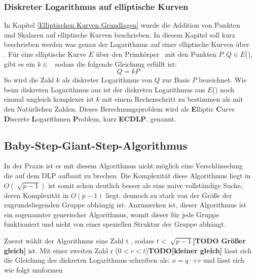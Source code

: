 		
		\subsubsection{Diskreter Logarithmus auf elliptische Kurven}
			In Kapitel \ref{Elliptischen Kurven Grundlagen} wurde die Addition von Punkten und Skalaren auf elliptische Kurven beschrieben. In diesem Kapitel soll kurz beschrieben werden was genau der Logarithmus auf einer elliptische Kurven über \myZPStern. Für eine elliptische Kurve $E$ über den Primkörper \myZPStern~mit den Punkten $P, Q \in E$(\myZPStern), gibt es ein $k \in$ \myZPStern~sodass die folgende Gleichung erfüllt ist:
			\begin{displaymath}
				Q = kP
			\end{displaymath}
			So wird die Zahl $k$ als diskreter Logarithmus von $Q$ zur Basis $P$ bezeichnet. Wie beim diskreten Logarithmus aus \myZPStern ist der diskreten Logarithmus aus $E$(\myZPStern) noch einmal ungleich komplexer ist $k$ mit einem Rechenschritt zu bestimmen als mit den Natürlichen Zahlen. Dieses Berechnungsproblem wird als \textbf{E}lliptic \textbf{C}urve \textbf{D}iscrete \textbf{L}ogarithmen \textbf{P}roblem, kurz \textbf{ECDLP}, genannt.
			
			
	\subsection{Baby-Step-Giant-Step-Algorithmus}
		In der Praxis ist es mit diesem Algorithmus nicht möglich eine Verschlüsselung die auf dem DLP aufbaut zu brechen. Die Komplexität diese Algorithmus liegt in $O(\sqrt[]{p-1})$ ist somit schon deutlich besser als eine naive vollständige Suche, deren Komplexität in $O(p-1)$ liegt, dennoch zu stark von der Größe der zugrundeliegenden Gruppe abhängig ist. Anzumerken ist, dieser Algorithmus ist ein sogenannter generischer Algorithmus, womit dieser für jede Gruppe funktioniert und nicht von einer speziellen Struktur der Gruppe abhängt.~\cite{Kryptografie:in:Theorie:und:Praxis}
		
		Zuerst wählt der Algorithmus eine Zahl t \myin {}, sodass $t < \sqrt[]{p-1}$\textbf{[TODO Größer gleich]} ist. Mit einer zweiten Zahl r ($0<r<t$)\textbf{TODO[kleiner gleich]} lässt sich die Gleichung des diskreten Logarithmus schreiben als: $x = q \cdot + r$ und lässt sich wie folgt umformen
		
